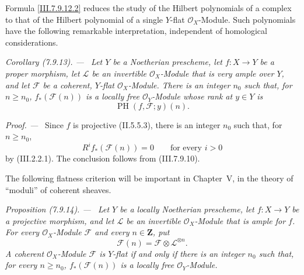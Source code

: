 \documentclass[10pt,oneside]{book}
\newcommand{\sh}[1]{\mathscr{#1}}
\newcommand{\bb}[1]{\mathbf{#1}}
\newcommand{\sref}[2][]{(#2)}
\newcommand{\oldpage}[2][]{\setcounter{footnote}{0}\marginpar{\scriptsize\textbf{#1}~|~#2}\ignorespaces}
\newenvironment{proposition}[1][]{\par\medskip\noindent\itshape Proposition (#1). ---\ }{\par}
\newenvironment{corollary}[1][]{\par\medskip\noindent\itshape Corollary (#1). ---\ }{\par}
\newenvironment{proof}{\par\medskip\noindent\textit{Proof. ---\ }}{\par}
\begin{document}
Formula \eqref{III.7.9.12.2} reduces the study of the
Hilbert polynomials of a complex to that of the Hilbert
polynomial of a single $Y$-flat $\sh{O}_X$-Module.  Such
polynomials have the following remarkable interpretation,
independent of homological considerations.

\begin{corollary}[7.9.13]
\label{III.7.9.13}
Let $Y$ be a Noetherian prescheme, let $f:X\to Y$ be a
proper morphism, let $\sh{L}$ be an invertible
$\sh{O}_X$-Module that is very ample over $Y$, and let
$\sh{F}$ be a coherent, $Y$-flat $\sh{O}_X$-Module.  There
is an integer $n_0$ such that, for $n\geq n_0$,
$f_*(\sh{F}(n))$ is a locally free $\sh{O}_Y$-Module whose
rank at $y\in Y$ is
\[
  \operatorname{PH}(f,\sh{F};y)(n).
\]
\end{corollary}

\begin{proof}
\oldpage[III]{212}
Since $f$ is projective \sref[II]{II.5.5.3}, there is an
integer $n_0$ such that, for $n\geq n_0$,
\[
  R^if_*(\sh{F}(n))=0
  \qquad\text{for every $i>0$}
\]
by \sref{III.2.2.1}.  The conclusion follows from
\sref{III.7.9.10}.
\end{proof}

The following flatness criterion will be important in
Chapter~V, in the theory of ``moduli'' of coherent
sheaves.

\begin{proposition}[7.9.14]
\label{III.7.9.14}
Let $Y$ be a locally Noetherian prescheme, let
$f:X\to Y$ be a projective morphism, and let $\sh{L}$ be
an invertible $\sh{O}_X$-Module that is ample for $f$.
For every $\sh{O}_X$-Module $\sh{F}$ and every
$n\in\bb{Z}$, put
\[
  \sh{F}(n)=\sh{F}\otimes\sh{L}^{\otimes n}.
\]
A coherent $\sh{O}_X$-Module $\sh{F}$ is $Y$-flat if and
only if there is an integer $n_0$ such that, for every
$n\geq n_0$, $f_*(\sh{F}(n))$ is a locally free
$\sh{O}_Y$-Module.
\end{proposition}
\end{document}
